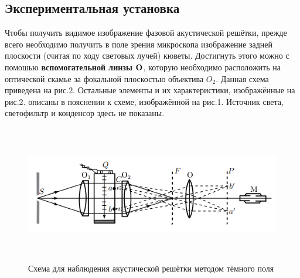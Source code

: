 \documentclass[12pt]{article}
\begin{document}
\subsection*{Экспериментальная установка}
\par
	Чтобы получить видимое изображение фазовой акустической решётки, прежде всего необходимо получить в поле зрения микроскопа изображение задней плоскости (считая по ходу световых лучей) кюветы. Достигнуть этого можно с помошью {\bf вспомогательной линзы ${\bf O}$}, которую необходимо расположить на оптической скамье за фокальной плоскостью объектива $O_2$. Данная схема приведена на рис.2. Остальные элементы и их характеристики, изображённые на рис.2. описаны в пояснении к схеме, изображённой на рис.1. Источник света, светофильтр и конденсор здесь не показаны.
\begin{figure}[h!]
	\centering
	\includegraphics[height = 6cm, width = 13cm]{image3.png}
	\caption{Схема для наблюдения акустической решётки методом тёмного поля}
\end{figure}
\end{document}

